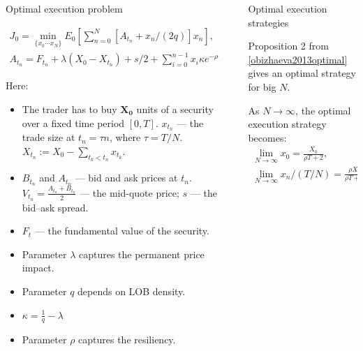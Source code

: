 \documentclass[]{beamer}
\begin{document}
\begin{frame}[t]
\begin{columns}[t]
\begin{column}{\onecolwid}
\begin{block}{Optimal execution problem}
        
        \begin{align}
            J_0 = \min _{\{x_0 \cdots x_N \}} E_0 \left[ \sum _{n=0}^N [A_{t_n} + x_n /(2q)] x_n\right],  \\
            A_{t_n} = F_{t_n} + \lambda (X_0 - X_{t_n}) + s/2 + \sum _{i=0}^{n-1} x_i \kappa e^{- \rho \tau (n - i)}
        \end{align}
        
       Here:
       \begin{itemize}
        \item The trader has to buy $\mathbf{X_0}$ units of a security over a ﬁxed time period $[0,T]$. $x_{t_n}$ 
        --- the trade size at $t_n = \tau n$, where $\tau = T / N$. $X_{t_n} := X_0 - \sum _{t_k < t_n} x_{t_k}$. 
        \item $B_{t_n}$ and $A_{t_n}$ --- bid and ask prices at $t_n$. $V_{t_n} = \frac{A_{t_n} + B_{t_n}}{2}$ 
        --- the mid-quote price; $s$ --- the bid–ask spread.
        \item $F_t$ --- the fundamental value of the security.
        \item Parameter $\lambda$ captures the permanent price impact.
        \item Parameter $q$ depends on LOB density. 
        \item $\kappa = \frac{1}{q} - \lambda $
        \item Parameter $\rho$ captures the resiliency.

       \end{itemize}
        \end{block}
    
    
    \end{column} 
    \begin{column}{\sepwid}\end{column} %
    
    \begin{column}{\onecolwid} %
    

    \begin{block}{Optimal execution strategies }
    
    Proposition 2 from \ref{obizhaeva2013optimal} gives an optimal strategy for big $N$.
    
    \begin{proposition}
        As $N \rightarrow \infty$, the optimal execution strategy becomes:
        \begin{align}
            \lim _{N \rightarrow \infty} x_0 = \frac{X_0}{\rho T + 2}, \\
            \lim _{N \rightarrow \infty} x_n / (T/N) = \frac{\rho X_0}{\rho T + 2}, \\
        \end{align}
    \end{proposition}
    \end{block}
   

\end{column}
\end{columns}
\end{frame}
\end{document}
